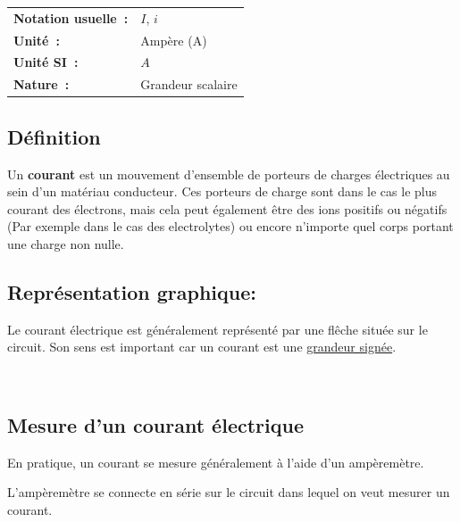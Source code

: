 \begin{tabular}{ll}
\textbf{Notation usuelle~:} & $I$, $i$ \\
\textbf{Unité~:} & Ampère (A) \\
\textbf{Unité SI~:} & $A$ \\
\textbf{Nature~:} & Grandeur scalaire \\
\end{tabular} 

\subsection*{Définition}

Un \textbf{courant} est un mouvement d'ensemble de porteurs de charges électriques au sein d'un matériau conducteur. Ces porteurs de charge sont dans le cas le plus courant des électrons, mais cela peut également être des ions positifs ou négatifs (Par exemple dans le cas des electrolytes) ou encore n'importe quel corps portant une charge non nulle. 


\subsection*{ Représentation graphique: }

\begin{minipage}{7cm}
	 
\end{minipage}
\hspace{1cm}
\begin{minipage}{7cm}
	Le courant électrique est généralement représenté par une flêche située sur le circuit. Son sens est important car un courant est une \underline{grandeur signée}. 
\end{minipage}\\

\subsection*{Mesure d'un courant électrique }

En pratique, un courant se mesure généralement à l'aide d'un ampèremètre. \\ 

\begin{minipage}{7cm}
\begin{center}

\end{center}
\end{minipage}
\hspace{1cm}
\begin{minipage}{7cm} 
	L'ampèremètre se connecte en série sur le circuit dans lequel on veut mesurer un courant. 
\end{minipage}\\

